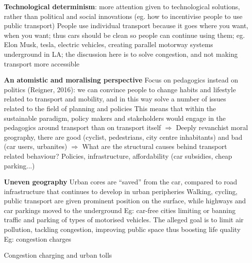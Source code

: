 \documentclass{article}
\begin{document}
\begin{outline}
	\1 \textbf{Technological determinism}: more attention given to technological solutions, rather than political and social innovations (eg. how to incentivise people to use public transport)
		\2 People use individual transport because it goes where you want, when you want; thus cars should be clean so people can continue using them; eg. Elon Musk, tesla, electric vehicles, creating parallel motorway systems underground in LA; the discussion here is to solve congestion, and not making transport more accessible
		
	\1 \textbf{An atomistic and moralising perspective}
		\2 Focus on pedagogics instead on politics (Reigner, 2016): we can convince people to change habits and lifestyle related to transport and mobility, and in this way solve a number of issues related to the field of planning and policies
		\2 This means that within the sustainable paradigm, policy makers and stakeholders would engage in the pedagogics around transport than on transport itself
		\2 $\Rightarrow$ Deeply revanchist moral geography, there are good (cyclist, pedestrians, city centre inhabitants) and bad (car users, urbanites)
		\2 $\Rightarrow$ What are the structural causes behind transport related behaviour? Policies, infrastructure, affordability (car subsidies, cheap parking...)
		
	\1 \textbf{Uneven geography}
		\2 Urban cores are ``saved'' from the car, compared to road infrastructure that continues to develop in urban peripheries
		\2 Walking, cycling, public transport are given prominent position on the surface, while highways and car parkings moved to the underground
		\2 Eg: car-free cities limiting or banning traffic and parking of types of motorised vehicles. The alleged goal is to limit air pollution, tackling congestion, improving public space thus boosting life quality
		\2 Eg: congestion charges
\end{outline}

Congestion charging and urban tolls
\end{document}
